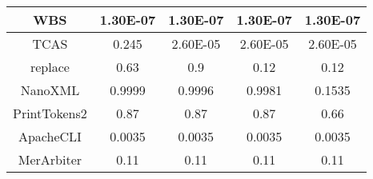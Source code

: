 \begin{table}
\begin{subtable}[t]{0.50\textwidth}
\begin{tabular}{ccccc}
                WBS                                                      & 1.30E-07                                                            & 1.30E-07                                                            & 1.30E-07                                                         & 1.30E-07                                                 \\ \hline
                TCAS                                                     & 0.245                                                               & 2.60E-05                                                            & 2.60E-05                                                         & 2.60E-05                                                 \\ \hline
                replace                                                  & 0.63                                                                & 0.9                                                                 & 0.12                                                             & 0.12                                                     \\ \hline
                NanoXML                                                  & 0.9999                                                              & 0.9996                                                              & 0.9981                                                           & 0.1535                                                   \\ \hline
                PrintTokens2                                             & 0.87                                                                & 0.87                                                                & 0.87                                                             & 0.66                                                     \\ \hline
                ApacheCLI                                                & 0.0035                                                              & 0.0035                                                              & 0.0035                                                           & 0.0035                                                   \\ \hline
                MerArbiter                                               & 0.11                                                                & 0.11                                                                & 0.11                                                             & 0.11                                                     \\ \hline

\end{tabular}
\end{subtable}
\end{table}
